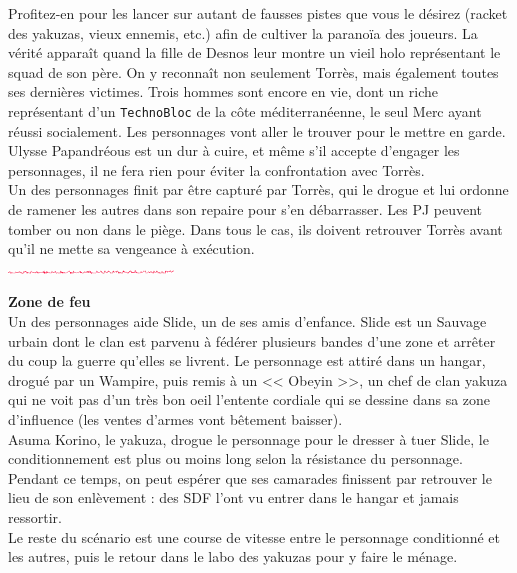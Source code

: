 \documentclass[11pt,twoside,a4paper]{article}
\def\barreCyberAgeThird{\includegraphics[width=0.33\textwidth]{img/Filet_CA.png}}
\begin{document}
\begin{multicols*}{3}
{Profitez-en pour les lancer sur autant de fausses pistes que vous le d{\'e}sirez (racket des yakuzas, vieux ennemis, etc.) afin de cultiver la parano{\"i}a des joueurs. La v{\'e}rit{\'e} appara{\^i}t quand la fille de Desnos leur montre un vieil holo repr{\'e}sentant le squad de son p{\`e}re. On y reconna{\^i}t non seulement Torr{\`e}s, mais {\'e}galement toutes ses derni{\`e}res victimes. Trois hommes sont encore en vie, dont un riche repr{\'e}sentant d'un \texttt{TechnoBloc} de la c{\^o}te m{\'e}diterran{\'e}enne, le seul Merc ayant r{\'e}ussi socialement. Les personnages vont aller le trouver pour le mettre en garde. Ulysse Papandr{\'e}ous est un dur {\`a} cuire, et m{\^e}me s'il accepte d'engager les personnages, il ne fera rien pour {\'e}viter la confrontation avec Torr{\`e}s.~\\

Un des personnages finit par {\^e}tre captur{\'e} par Torr{\`e}s, qui le drogue et lui ordonne de ramener les autres dans son repaire pour s'en d{\'e}barrasser. Les PJ peuvent tomber ou non dans le pi{\`e}ge. Dans tous le cas, ils doivent retrouver Torr{\`e}s avant qu'il ne mette sa vengeance {\`a} ex{\'e}cution.~\\

\barreCyberAgeThird
\vfill

\textbf{Zone de feu}~\\

Un des personnages aide Slide, un de ses amis d'enfance. Slide est un Sauvage urbain dont le clan est parvenu {\`a} f{\'e}d{\'e}rer plusieurs bandes d'une zone et arr{\^e}ter du coup la guerre qu'elles se livrent. Le personnage est attir{\'e} dans un hangar, drogu{\'e} par un Wampire, puis remis {\`a} un << Obeyin >>, un chef de clan yakuza qui ne voit pas d'un tr{\`e}s bon oeil l'entente cordiale qui se dessine dans sa zone d'influence (les ventes d'armes vont b{\^e}tement baisser).~\\

Asuma Korino, le yakuza, drogue le personnage pour le dresser {\`a} tuer Slide, le conditionnement est plus ou moins long selon la r{\'e}sistance du personnage. Pendant ce temps, on peut esp{\'e}rer que ses camarades finissent par retrouver le lieu de son enl{\`e}vement : des SDF l'ont vu entrer dans le hangar et jamais ressortir.~\\

Le reste du sc{\'e}nario est une course de vitesse entre le personnage conditionn{\'e} et les autres, puis le retour dans le labo des yakuzas pour y faire le m{\'e}nage.~\\

}
\end{multicols*}
\end{document}
